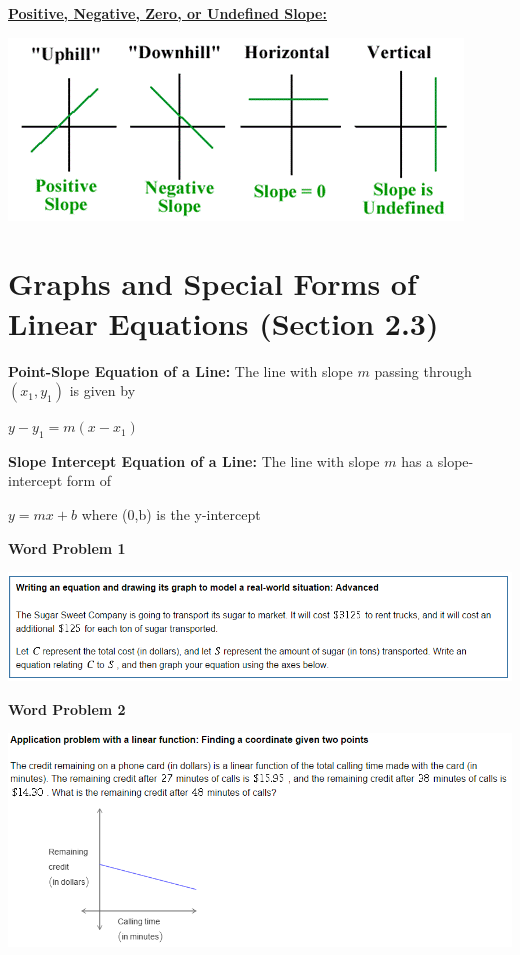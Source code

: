 \documentclass[12pt]{article}
\begin{document}
\vspace{.5cm}

\underline{\textbf{Positive, Negative, Zero, or Undefined Slope:}}

\centerline{\includegraphics{Slope.png}}

\section{Graphs and Special Forms of Linear Equations (Section 2.3)}

\textbf{Point-Slope Equation of a Line:} The line with slope $m$ passing through $(x_{1}, y_{1})$ is given by
\newline

\centerline{$y - y_{1} = m(x-x_{1})$}
\vspace{.5cm}

\textbf{Slope Intercept Equation of a Line:} The line with slope $m$ has a slope-intercept form of 
\newline

\centerline{$y = mx+b$ \hspace{1cm} where (0,b) is the y-intercept}
\vspace{.5cm}

\newpage

\textbf{Word Problem 1}

\centerline{\includegraphics[scale = 0.9]{WordProblem1.png}}

\newpage

\textbf{Word Problem 2}

\centerline{\includegraphics[scale = 0.9]{WordProblem2.png}}
\end{document}
